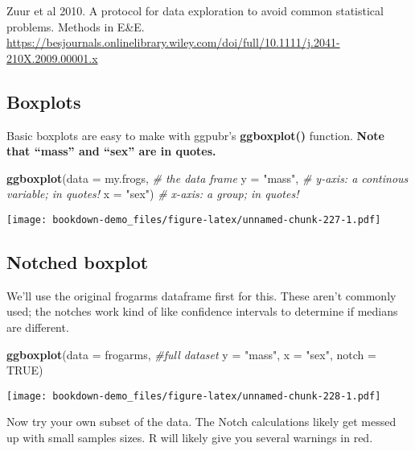 \documentclass[]{book}
\newenvironment{Shaded}{\begin{snugshade}}{\end{snugshade}}
\newcommand{\KeywordTok}[1]{\textcolor[rgb]{0.13,0.29,0.53}{\textbf{#1}}}
\newcommand{\DataTypeTok}[1]{\textcolor[rgb]{0.13,0.29,0.53}{#1}}
\newcommand{\StringTok}[1]{\textcolor[rgb]{0.31,0.60,0.02}{#1}}
\newcommand{\CommentTok}[1]{\textcolor[rgb]{0.56,0.35,0.01}{\textit{#1}}}
\newcommand{\OtherTok}[1]{\textcolor[rgb]{0.56,0.35,0.01}{#1}}
\newcommand{\NormalTok}[1]{#1}
\theoremstyle{definition}
\theoremstyle{definition}
\theoremstyle{definition}
\theoremstyle{remark}
\begin{document}
Zuur et al 2010. A protocol for data exploration to avoid common
statistical problems. Methods in E\&E.
\url{https://besjournals.onlinelibrary.wiley.com/doi/full/10.1111/j.2041-210X.2009.00001.x}

\subsection{Boxplots}\label{boxplots}

Basic boxplots are easy to make with ggpubr's \textbf{ggboxplot()}
function. \textbf{Note that ``mass'' and ``sex'' are in quotes.}

\begin{Shaded}
\begin{Highlighting}[]
\KeywordTok{ggboxplot}\NormalTok{(}\DataTypeTok{data =}\NormalTok{ my.frogs, }\CommentTok{# the data frame}
          \DataTypeTok{y =} \StringTok{"mass"}\NormalTok{,      }\CommentTok{# y-axis: a continous variable; in quotes!}
          \DataTypeTok{x =} \StringTok{"sex"}\NormalTok{)       }\CommentTok{# x-axis: a group; in quotes!}
\end{Highlighting}
\end{Shaded}

\texttt{[image: bookdown-demo\_files/figure-latex/unnamed-chunk-227-1.pdf]}

\subsection{Notched boxplot}\label{notched-boxplot}

We'll use the original frogarms dataframe first for this. These aren't
commonly used; the notches work kind of like confidence intervals to
determine if medians are different.

\begin{Shaded}
\begin{Highlighting}[]
\KeywordTok{ggboxplot}\NormalTok{(}\DataTypeTok{data =}\NormalTok{ frogarms, }\CommentTok{#full dataset}
          \DataTypeTok{y =} \StringTok{"mass"}\NormalTok{,}
          \DataTypeTok{x =} \StringTok{"sex"}\NormalTok{,}
          \DataTypeTok{notch  =} \OtherTok{TRUE}\NormalTok{) }
\end{Highlighting}
\end{Shaded}

\texttt{[image: bookdown-demo\_files/figure-latex/unnamed-chunk-228-1.pdf]}

Now try your own subset of the data. The Notch calculations likely get
messed up with small samples sizes. R will likely give you several
warnings in red.
\end{document}
